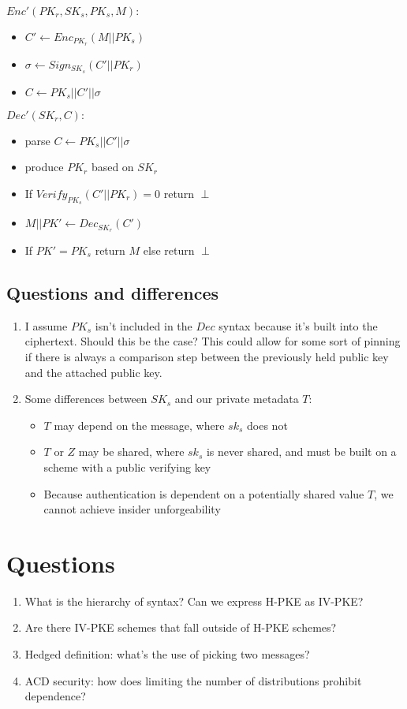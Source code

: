 \documentclass[11pt, pdftex]{article}
\begin{document}
$Enc'(PK_r, SK_s, PK_s, M):$
\begin{itemize}
\item $C' \leftarrow Enc_{PK_r}(M||PK_s)$
\item $\sigma \leftarrow Sign_{SK_s}(C'||PK_r)$
\item $C \leftarrow PK_s||C'||\sigma$\\
\end{itemize}

$Dec'(SK_r, C):$
\begin{itemize}
\item parse $C \leftarrow PK_s||C'||\sigma$
\item produce $PK_r$ based on $SK_r$
\item If $Verify_{PK_s}(C'||PK_r) = 0$ return $\perp$
\item $M||PK' \leftarrow Dec_{SK_r}(C')$
\item If $PK' = PK_s$ return $M$ else return $\perp$
\end{itemize}

\subsection{Questions and differences}
\begin{enumerate}
\item I assume $PK_s$ isn't included in the $Dec$ syntax because it's built into the ciphertext.  Should this be the case?  This could allow for
some sort of pinning if there is always a comparison step between the previously held public key and the attached public key.
\item Some differences between $SK_s$ and our private metadata $T$:
\begin{itemize}
\item $T$ may depend on the message, where $sk_s$ does not
\item $T$ or $Z$ may be shared, where $sk_s$ is never shared, and must be built on a scheme with a public verifying key
\item Because authentication is dependent on a potentially shared value $T$, we cannot achieve insider unforgeability
\end{itemize}
\end{enumerate}


\section{Questions}
\begin{enumerate}
\item What is the hierarchy of syntax?  Can we express H-PKE as IV-PKE? 
\item Are there IV-PKE schemes that fall outside of H-PKE schemes?
\item Hedged definition: what's the use of picking two messages?
\item ACD security: how does limiting the number of distributions prohibit dependence?
\end{enumerate}
\end{document}

